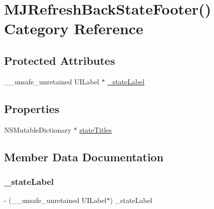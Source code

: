 \hypertarget{category_m_j_refresh_back_state_footer_07_08}{}\section{M\+J\+Refresh\+Back\+State\+Footer() Category Reference}
\label{category_m_j_refresh_back_state_footer_07_08}
\subsection*{Protected Attributes}
\begin{DoxyCompactItemize}
\item 
\+\_\+\+\_\+unsafe\+\_\+unretained U\+I\+Label $\ast$ \mbox{\hyperlink{category_m_j_refresh_back_state_footer_07_08_af5c20bc12128838be1ac1991a8a97813}{\+\_\+state\+Label}}
\end{DoxyCompactItemize}
\subsection*{Properties}
\begin{DoxyCompactItemize}
\item 
N\+S\+Mutable\+Dictionary $\ast$ \mbox{\hyperlink{category_m_j_refresh_back_state_footer_07_08_aa5edbb5b7280b2fdcbab8e71935dcfcb}{state\+Titles}}
\end{DoxyCompactItemize}


\subsection{Member Data Documentation}
\mbox{\label{category_m_j_refresh_back_state_footer_07_08_af5c20bc12128838be1ac1991a8a97813}} 
\subsubsection{\texorpdfstring{\+\_\+state\+Label}{\_stateLabel}}
{\footnotesize\ttfamily -\/ (\+\_\+\+\_\+unsafe\+\_\+unretained U\+I\+Label$\ast$) \+\_\+state\+Label\hspace{0.3cm}{\ttfamily [protected]}}

